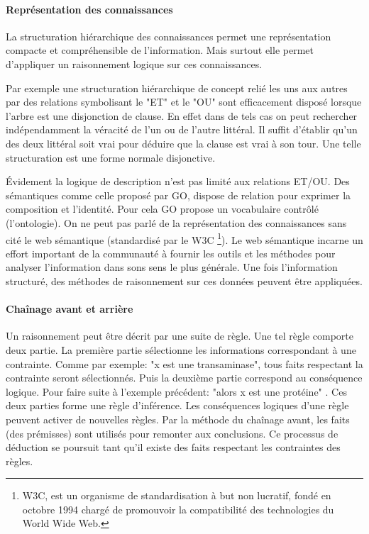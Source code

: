 \begin{refsegment}
    \paragraph{Représentation des connaissances}
    La structuration hiérarchique des connaissances permet une représentation compacte et compréhensible de l'information. Mais surtout elle permet d'appliquer un raisonnement logique sur ces connaissances.
    
    Par exemple une structuration hiérarchique de concept relié les uns aux autres par des relations symbolisant le "ET" et le "OU" sont efficacement disposé lorsque l'arbre est une disjonction de clause.
    En effet dans de tels cas on peut rechercher indépendamment la véracité de l'un ou de l'autre littéral. Il suffit d'établir qu'un des deux littéral soit vrai pour déduire que la clause est vrai à son tour. Une telle structuration est une forme normale disjonctive.
    
    Évidement la logique de description n'est pas limité aux relations ET/OU. Des sémantiques comme celle proposé par \acrfull{GO}, dispose de relation pour exprimer la composition et l'identité. Pour cela  \acrfull{GO} propose un vocabulaire contrôlé (l'ontologie). On ne peut pas parlé de la représentation des connaissances sans cité le web sémantique (standardisé par le W3C \footnote{W3C, est un organisme de standardisation à but non lucratif, fondé en octobre 1994 chargé de promouvoir la compatibilité des technologies du World Wide Web.}). Le web sémantique incarne un effort important de la communauté à fournir les outils et les méthodes pour analyser l'information dans sons sens le plus générale. Une fois l'information structuré, des méthodes de raisonnement sur ces données peuvent être appliquées.
    
    \paragraph{Chaînage avant et arrière} %
    Un raisonnement peut être décrit par une suite de règle. Une tel règle comporte deux partie. La première partie sélectionne les informations correspondant à une contrainte. Comme par exemple: "x est une transaminase", tous faits respectant la contrainte seront sélectionnés. Puis la deuxième partie correspond au conséquence logique. Pour faire suite à l'exemple précédent: "alors x est une protéine" . Ces deux parties forme une règle d'inférence. Les conséquences logiques d'une règle peuvent activer de nouvelles règles. Par la méthode du chaînage avant, les faits (des prémisses) sont utilisés pour remonter aux conclusions. Ce processus de déduction se poursuit tant qu'il existe des faits respectant les contraintes des règles.
    

\end{refsegment}
